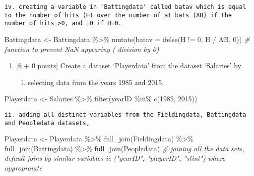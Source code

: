 \documentclass[
]{article}
\newenvironment{Shaded}{\begin{snugshade}}{\end{snugshade}}
\newcommand{\AttributeTok}[1]{\textcolor[rgb]{0.77,0.63,0.00}{#1}}
\newcommand{\CommentTok}[1]{\textcolor[rgb]{0.56,0.35,0.01}{\textit{#1}}}
\newcommand{\DecValTok}[1]{\textcolor[rgb]{0.00,0.00,0.81}{#1}}
\newcommand{\FunctionTok}[1]{\textcolor[rgb]{0.00,0.00,0.00}{#1}}
\newcommand{\NormalTok}[1]{#1}
\newcommand{\OtherTok}[1]{\textcolor[rgb]{0.56,0.35,0.01}{#1}}
\newcommand{\SpecialCharTok}[1]{\textcolor[rgb]{0.00,0.00,0.00}{#1}}
\providecommand{\tightlist}{%
  \setlength{\itemsep}{0pt}\setlength{\parskip}{0pt}}
\begin{document}
\begin{verbatim}
iv. creating a variable in 'Battingdata' called batav which is equal to the number of hits (H) over the number of at bats (AB) if the number of hits >0, and =0 if H=0.
\end{verbatim}

\begin{Shaded}
\begin{Highlighting}[]
\NormalTok{Battingdata }\OtherTok{\textless{}{-}}\NormalTok{ Battingdata }\SpecialCharTok{\%\textgreater{}\%}
  \FunctionTok{mutate}\NormalTok{(}\AttributeTok{batav =} \FunctionTok{ifelse}\NormalTok{(H }\SpecialCharTok{!=} \DecValTok{0}\NormalTok{, H }\SpecialCharTok{/}\NormalTok{ AB, }\DecValTok{0}\NormalTok{)) }\CommentTok{\# function to prevent NaN appearing ( division by 0)}
\end{Highlighting}
\end{Shaded}

\begin{enumerate}
\def\labelenumi{\alph{enumi}.}
\setcounter{enumi}{2}
\item
  {[}6 + 0 points{]} Create a dataset `Playerdata' from the dataset
  `Salaries' by

  \begin{enumerate}
  \def\labelenumii{\roman{enumii}.}
  \tightlist
  \item
    selecting data from the years 1985 and 2015,
  \end{enumerate}
\end{enumerate}

\begin{Shaded}
\begin{Highlighting}[]
\NormalTok{Playerdata }\OtherTok{\textless{}{-}}\NormalTok{ Salaries }\SpecialCharTok{\%\textgreater{}\%}
  \FunctionTok{filter}\NormalTok{(yearID }\SpecialCharTok{\%in\%} \FunctionTok{c}\NormalTok{(}\DecValTok{1985}\NormalTok{, }\DecValTok{2015}\NormalTok{))}
\end{Highlighting}
\end{Shaded}

\begin{verbatim}
ii. adding all distinct variables from the Fieldingdata, Battingdata and Peopledata datasets,
\end{verbatim}

\begin{Shaded}
\begin{Highlighting}[]
\NormalTok{Playerdata }\OtherTok{\textless{}{-}}\NormalTok{ Playerdata }\SpecialCharTok{\%\textgreater{}\%}
  \FunctionTok{full\_join}\NormalTok{(Fieldingdata) }\SpecialCharTok{\%\textgreater{}\%}
  \FunctionTok{full\_join}\NormalTok{(Battingdata) }\SpecialCharTok{\%\textgreater{}\%}
  \FunctionTok{full\_join}\NormalTok{(Peopledata) }\CommentTok{\# joining all the data sets, default joins by similar variables ie ("yearID", "playerID", "stint") where appropraiate}
\end{Highlighting}
\end{Shaded}
\end{document}
